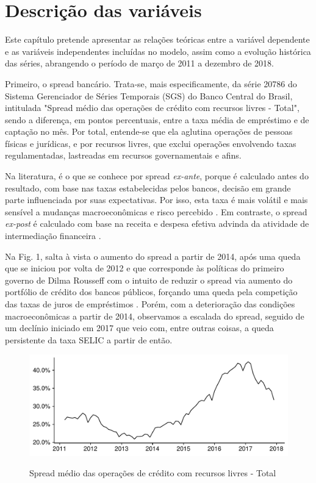 \documentclass[a4paper, article, 12pt, openany, oneside, english, brazil]{abntex2}
\begin{document}
\textual

\pagestyle{fancy}
\renewcommand{\headrulewidth}{0pt}

\section{Descrição das variáveis}

    Este capítulo pretende apresentar as relações teóricas entre a variável dependente e as variáveis independentes incluídas no modelo, assim como a evolução histórica das séries, abrangendo o período de março de 2011 a dezembro de 2018.

    Primeiro, o spread bancário. Trata-se, mais especificamente, da série 20786 do Sistema Gerenciador de Séries Temporais (SGS) do Banco Central do Brasil, intitulada "Spread médio das operações de crédito com recursos livres - Total", sendo a diferença, em pontos percentuais, entre a taxa média de empréstimo e de captação no mês. Por total, entende-se que ela aglutina operações de pessoas físicas e jurídicas, e por recursos livres, que exclui operações envolvendo taxas regulamentadas, lastreadas em recursos governamentais e afins.

    Na literatura, é o que se conhece por spread \textit{ex-ante}, porque é calculado antes do resultado, com base nas taxas estabelecidas pelos bancos, decisão em grande parte influenciada por suas expectativas. Por isso, esta taxa é mais volátil e mais sensível a mudanças macroeconômicas e risco percebido \cite[p.~226]{leal07}. Em contraste, o spread \textit{ex-post} é calculado com base na receita e despesa efetiva advinda da atividade de intermediação financeira \cite[p.~2]{almeida15}. 
    
    Na Fig. 1, salta à vista o aumento do spread a partir de 2014, após uma queda que se iniciou por volta de 2012 e que corresponde às políticas do primeiro governo de Dilma Rousseff com o intuito de reduzir o spread via aumento do portfólio de crédito dos bancos públicos, forçando uma queda pela competição das taxas de juros de empréstimos \cite[p.~1]{almeida15}. Porém, com a deterioração das condições macroeconômicas a partir de 2014, observamos a escalada do spread, seguido de um declínio iniciado em 2017 que veio com, entre outras coisas, a queda persistente da taxa SELIC a partir de então.

\begin{figure}[h]
  \centering
    \caption{Spread médio das operações de crédito com recursos livres - Total}
      \includegraphics[width = \textwidth, scale=0.75]{Spread.pdf}
      \label{spread}
\end{figure}
    
\end{document}
